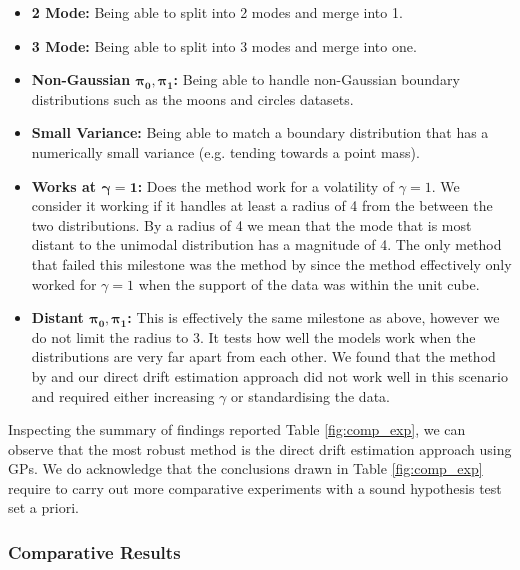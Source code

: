 \documentclass[a4paper,12pt,twoside,openright]{report}
\theoremstyle{definition}
\begin{document}
\begin{itemize}
    \item \textbf{ 2 Mode:} Being able to split into 2 modes and merge into 1.
    \item \textbf{ 3 Mode:} Being able to split into 3 modes and merge into one.
    \item \textbf{Non-Gaussian $\bm{\pi_0,\pi_1}$:} Being able to handle non-Gaussian boundary distributions such as the moons and circles datasets. 
    \item \textbf{Small Variance:} Being able to match a boundary distribution that has a numerically small variance (e.g. tending towards a point mass).  
    \item \textbf{Works at $\bm{\gamma=1}$:} Does the method work for a volatility of $\gamma=1$. We consider it working if it handles at least  a radius of 4 from the between the two distributions. By a radius of 4 we mean that the mode that is most distant to the unimodal distribution has a magnitude of 4. The only method that failed this milestone was the method by \cite{pavon2018data} since the method effectively only worked for $\gamma=1$ when the support of the data was within the unit cube.
    \item \textbf{Distant $\bm{\pi_0, \pi_1}$:} This is effectively the same milestone as above, however we do not limit the radius to 3. It tests how well the models work when the distributions are very far apart from each other. We found that the method by \cite{pavon2018data} and our direct drift estimation approach did not work well in this scenario and required either increasing $\gamma$ or standardising the data.
\end{itemize}

Inspecting the summary of findings reported Table \ref{fig:comp_exp}, we can observe that the most robust method is the direct drift estimation approach using GPs.  We do acknowledge that the conclusions drawn in Table \ref{fig:comp_exp} require to carry out more comparative experiments with a sound hypothesis test set a priori. 

\subsubsection{Comparative Results}
\end{document}
